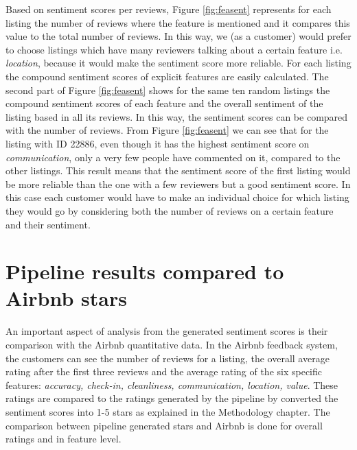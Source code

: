 Based on sentiment scores per reviews, Figure \ref{fig:feasent} represents for each listing the number of reviews where the feature is mentioned and it compares this value to the total number of reviews. In this way, we (as a customer) would prefer to choose listings which have many reviewers talking about a certain feature i.e. \textit{location}, because it would make the sentiment score more reliable. For each listing the compound sentiment scores of explicit features are easily calculated. The second part of Figure \ref{fig:feasent} shows for the same ten random listings the compound sentiment scores of each feature and the overall sentiment of the listing based in all its reviews. In this way, the sentiment scores can be compared with the number of reviews. From Figure \ref{fig:feasent} we can see that for the listing with ID 22886, even though it has the highest sentiment score on \textit{communication}, only a very few people have commented on it, compared to the other listings. This result means that the sentiment score of the first listing would be more reliable than the one with a few reviewers but a good sentiment score. In this case each customer would have to make an individual choice for which listing they would go by considering both the number of reviews on a certain feature and their sentiment. 

\section{Pipeline results compared to Airbnb stars}
An important aspect of analysis from the generated sentiment scores is their comparison with the Airbnb quantitative data. In the Airbnb feedback system, the customers can see the number of reviews for a listing, the overall average rating after the first three reviews and the average rating of the six specific features: \textit{accuracy, check-in, cleanliness, communication, location, value}. These ratings are compared to the ratings generated by the pipeline by converted the sentiment scores into 1-5 stars as explained in the Methodology chapter. The comparison between pipeline generated stars and Airbnb is done for overall ratings and in feature level. 

